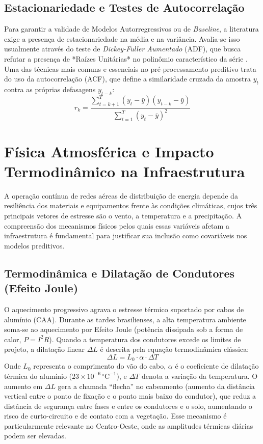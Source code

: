 \subsection{Estacionariedade e Testes de Autocorrelação}
Para garantir a validade de Modelos Autorregressivos ou de \textit{Baseline}, a literatura exige a presença de estacionariedade na média e na variância. Avalia-se isso usualmente através do teste de \textit{Dickey-Fuller Aumentado} (ADF), que busca refutar a presença de *Raízes Unitárias* no polinômio característico da série \cite{shumway2017time}. Uma das técnicas mais comuns e essenciais no pré-processamento preditivo trata do uso da autocorrelação (ACF), que define a similaridade cruzada da amostra $y_t$ contra as próprias defasagens $y_{t-k}$:
\begin{equation}
    r_k = \frac{\sum_{t=k+1}^T (y_t - \bar{y})(y_{t-k} - \bar{y})}{\sum_{t=1}^T (y_t - \bar{y})^2}
    \label{eq:acf}
\end{equation}

\section{Física Atmosférica e Impacto Termodinâmico na Infraestrutura}\label{sec:fisica_atmosferica}
A operação contínua de redes aéreas de distribuição de energia depende da resiliência dos materiais e equipamentos frente às condições climáticas, cujos três principais vetores de estresse são o vento, a temperatura e a precipitação. A compreensão dos mecanismos físicos pelos quais essas variáveis afetam a infraestrutura é fundamental para justificar sua inclusão como covariáveis nos modelos preditivos.

\subsection{Termodinâmica e Dilatação de Condutores (Efeito Joule)}
O aquecimento progressivo agrava o estresse térmico suportado por cabos de alumínio (CAA). Durante as tardes brasilienses, a alta temperatura ambiente soma-se ao aquecimento por Efeito Joule (potência dissipada sob a forma de calor, $P = I^2 R$). Quando a temperatura dos condutores excede os limites de projeto, a dilatação linear $\Delta L$ é descrita pela equação termodinâmica clássica:
\begin{equation}
    \Delta L = L_0 \cdot \alpha \cdot \Delta T
    \label{eq:dilatacao}
\end{equation}
Onde $L_0$ representa o comprimento do vão do cabo, $\alpha$ é o coeficiente de dilatação térmica do alumínio ($23 \times 10^{-6} \, {}^\circ\mathrm{C}^{-1}$), e $\Delta T$ denota a variação da temperatura. O aumento em $\Delta L$ gera a chamada ``flecha'' no cabeamento (aumento da distância vertical entre o ponto de fixação e o ponto mais baixo do condutor), que reduz a distância de segurança entre fases e entre os condutores e o solo, aumentando o risco de curto-circuito e de contato com a vegetação. Esse mecanismo é particularmente relevante no Centro-Oeste, onde as amplitudes térmicas diárias podem ser elevadas.

